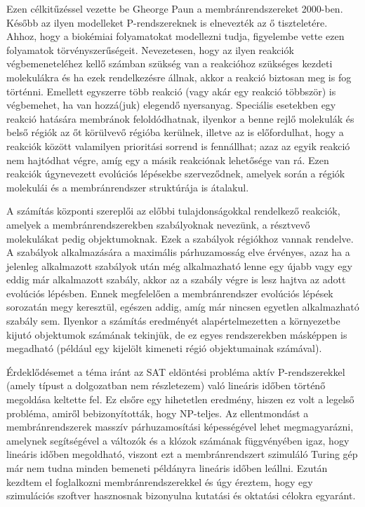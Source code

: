 Ezen célkitűzéssel vezette be Gheorge Paun a membránrendszereket 2000-ben. Később az ilyen modelleket P-rendszereknek is elnevezték az ő tiszteletére. Ahhoz, hogy a biokémiai folyamatokat modellezni tudja, figyelembe vette ezen folyamatok törvényszerűségeit. Nevezetesen, hogy az ilyen reakciók végbemeneteléhez kellő számban szükség van a reakcióhoz szükséges kezdeti molekulákra és ha ezek rendelkezésre állnak, akkor a reakció biztosan meg is fog történni. Emellett egyszerre több reakció (vagy akár egy reakció többször) is végbemehet, ha van hozzá(juk) elegendő nyersanyag. Speciális esetekben egy reakció hatására membránok feloldódhatnak, ilyenkor a benne rejlő molekulák és belső régiók az őt körülvevő régióba kerülnek, illetve az is előfordulhat, hogy a reakciók között valamilyen prioritási sorrend is fennállhat; azaz az egyik reakció nem hajtódhat végre, amíg egy a másik reakciónak lehetősége van rá. Ezen reakciók úgynevezett evolúciós lépésekbe szerveződnek, amelyek során a régiók molekulái és a membránrendszer struktúrája is átalakul.

A számítás központi szereplői az előbbi tulajdonságokkal rendelkező reakciók, amelyek a membránrendszerekben szabályoknak nevezünk, a résztvevő molekulákat pedig objektumoknak. Ezek a szabályok régiókhoz vannak rendelve. A szabályok alkalmazására a maximális párhuzamosság elve érvényes, azaz ha a jelenleg alkalmazott szabályok után még alkalmazható lenne egy újabb vagy egy eddig már alkalmazott szabály, akkor az a szabály végre is lesz hajtva az adott evolúciós lépésben. Ennek megfelelően a membránrendszer evolúciós lépések sorozatán megy keresztül, egészen addig, amíg már nincsen egyetlen alkalmazható szabály sem. Ilyenkor a számítás eredményét alapértelmezetten a környezetbe kijutó objektumok számának tekinjük, de ez egyes rendszerekben másképpen is megadható (például egy kijelölt kimeneti régió objektumainak számával).

Érdeklődésemet a téma iránt az SAT eldöntési probléma aktív P-rendszerekkel (amely típust a dolgozatban nem részletezem) való lineáris időben történő megoldása keltette fel. Ez elsőre egy hihetetlen eredmény, hiszen ez volt a legelső probléma, amiről bebizonyították, hogy NP-teljes. Az ellentmondást a membránrendszerek masszív párhuzamosítási képességével lehet megmagyarázni, amelynek segítségével a változók és a klózok számának függvényében igaz, hogy lineáris időben megoldható, viszont ezt a membránrendszert szimuláló Turing gép már nem tudna minden bemeneti példányra lineáris időben leállni. Ezután kezdtem el foglalkozni membránrendszerekkel és úgy éreztem, hogy egy szimulációs szoftver hasznosnak bizonyulna kutatási és oktatási célokra egyaránt.

